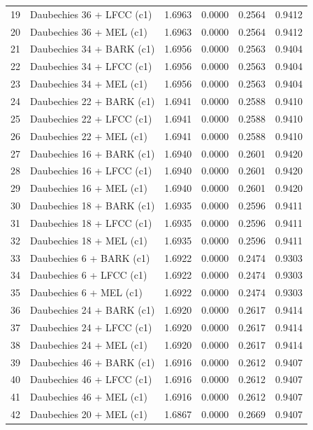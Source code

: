 \begin{longtable}{@{}rlrrrr@{}}
19 & Daubechies 36 + LFCC (c1) & 1.6963 & 0.0000 & 0.2564 & 0.9412 \\
20 & Daubechies 36 + MEL (c1) & 1.6963 & 0.0000 & 0.2564 & 0.9412 \\
21 & Daubechies 34 + BARK (c1) & 1.6956 & 0.0000 & 0.2563 & 0.9404 \\
22 & Daubechies 34 + LFCC (c1) & 1.6956 & 0.0000 & 0.2563 & 0.9404 \\
23 & Daubechies 34 + MEL (c1) & 1.6956 & 0.0000 & 0.2563 & 0.9404 \\
24 & Daubechies 22 + BARK (c1) & 1.6941 & 0.0000 & 0.2588 & 0.9410 \\
25 & Daubechies 22 + LFCC (c1) & 1.6941 & 0.0000 & 0.2588 & 0.9410 \\
26 & Daubechies 22 + MEL (c1) & 1.6941 & 0.0000 & 0.2588 & 0.9410 \\
27 & Daubechies 16 + BARK (c1) & 1.6940 & 0.0000 & 0.2601 & 0.9420 \\
28 & Daubechies 16 + LFCC (c1) & 1.6940 & 0.0000 & 0.2601 & 0.9420 \\
29 & Daubechies 16 + MEL (c1) & 1.6940 & 0.0000 & 0.2601 & 0.9420 \\
30 & Daubechies 18 + BARK (c1) & 1.6935 & 0.0000 & 0.2596 & 0.9411 \\
31 & Daubechies 18 + LFCC (c1) & 1.6935 & 0.0000 & 0.2596 & 0.9411 \\
32 & Daubechies 18 + MEL (c1) & 1.6935 & 0.0000 & 0.2596 & 0.9411 \\
33 & Daubechies 6 + BARK (c1) & 1.6922 & 0.0000 & 0.2474 & 0.9303 \\
34 & Daubechies 6 + LFCC (c1) & 1.6922 & 0.0000 & 0.2474 & 0.9303 \\
35 & Daubechies 6 + MEL (c1) & 1.6922 & 0.0000 & 0.2474 & 0.9303 \\
36 & Daubechies 24 + BARK (c1) & 1.6920 & 0.0000 & 0.2617 & 0.9414 \\
37 & Daubechies 24 + LFCC (c1) & 1.6920 & 0.0000 & 0.2617 & 0.9414 \\
38 & Daubechies 24 + MEL (c1) & 1.6920 & 0.0000 & 0.2617 & 0.9414 \\
39 & Daubechies 46 + BARK (c1) & 1.6916 & 0.0000 & 0.2612 & 0.9407 \\
40 & Daubechies 46 + LFCC (c1) & 1.6916 & 0.0000 & 0.2612 & 0.9407 \\
41 & Daubechies 46 + MEL (c1) & 1.6916 & 0.0000 & 0.2612 & 0.9407 \\
42 & Daubechies 20 + MEL (c1) & 1.6867 & 0.0000 & 0.2669 & 0.9407 \\

\end{longtable}
